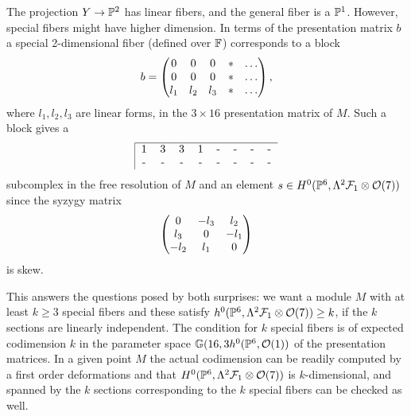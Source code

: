 The projection $Y \to {\mathbb P}^2$ has linear fibers, and the general fiber is a 
${\mathbb P}^1$. However, special fibers might have higher dimension. In terms
of the presentation matrix $b$ a special 2-dimensional fiber (defined
over ${\mathbb F}$) corresponds to a block
$$
b=\begin{pmatrix}
0 & 0 & 0 & * & \ldots \cr
0 & 0 & 0 & * & \ldots \cr
l_1 & l_2 & l_3 & *& \ldots \cr 
\end{pmatrix},
$$
where $l_1,l_2,l_3$ are linear forms, in the $3\times16$ presentation matrix of $M$.
Such a block gives a 
$$
\begin{tabular}{|cccccccc}
\hline
1 & 3 & 3 & 1 & - & - & - &- \cr
- & - & - & - & - & - & - & - \cr
\end{tabular}
$$
subcomplex in the free resolution of $M$ and an element 
$s \in H^0({\mathbb P}^6,\Lambda^2 {\mathcal F}_1 \otimes {\mathcal O}(7))$
since the syzygy matrix
$$
\begin{pmatrix}
0 & -l_3 & l_2  \cr
l_3 & 0 & -l_1  \cr
-l_2 & l_1 & 0  \cr 
\end{pmatrix}
$$
is skew. 

This answers the questions posed by both surprises: 
we want a module $M$ with at least $k \ge 3$ special
fibers and these satisfy $h^0({\mathbb P}^6,\Lambda^2 {\mathcal F}_1 \otimes {\mathcal O}(7)) \ge k$, 
if the $k$ sections are linearly independent. 
The condition for $k$ special fibers is of expected codimension $k$ in the
parameter space ${\mathbb G}(16,3h^0({\mathbb P}^6,{\mathcal O}(1))$ of the presentation matrices.
In a given point $M$ the actual codimension can be readily computed
by a first order deformations and that 
$H^0({\mathbb P}^6,\Lambda^2 {\mathcal F}_1 \otimes {\mathcal O}(7))$ is $k$-dimensional, and spanned by the
$k$ sections corresponding to the $k$ special fibers can be checked as well. 

